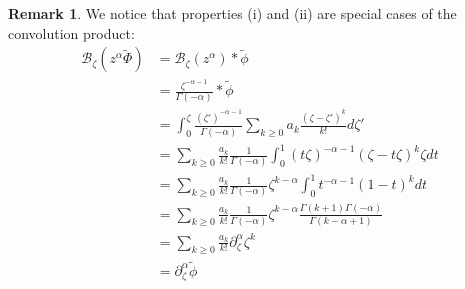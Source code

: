 \documentclass{article}
\theoremstyle{definition}
\newcommand{\borel}{\mathcal{B}}
\newtheorem{remark}[definition]{Remark}
\begin{document}
\begin{remark}
We notice that properties (i) and (ii) are special cases of the convolution product:
\begin{align*}
\borel_\zeta (z^\alpha \tilde{\Phi})&=\borel_\zeta (z^\alpha)\ast \tilde{\phi}\\
&=\frac{\zeta^{-\alpha-1}}{\Gamma(-\alpha)}\ast\tilde{\phi}\\
&=\int_0^\zeta \frac{(\zeta')^{-\alpha-1}}{\Gamma(-\alpha)}\sum_{k\geq 0}a_k\frac{(\zeta-\zeta')^k}{k!}d\zeta'\\
&=\sum_{k\geq 0}\frac{a_k}{k!}\frac{1}{\Gamma(-\alpha)}\int_0^1(t\zeta)^{-\alpha-1}(\zeta-t\zeta)^k\zeta dt\\
&=\sum_{k\geq 0}\frac{a_k}{k!}\frac{1}{\Gamma(-\alpha)}\zeta^{k-\alpha}\int_0^1 t^{-\alpha-1}(1-t)^k dt\\
&=\sum_{k\geq 0}\frac{a_k}{k!}\frac{1}{\Gamma(-\alpha)}\zeta^{k-\alpha}\frac{\Gamma(k+1)\Gamma(-\alpha)}{\Gamma(k-\alpha+1)}\\
&=\sum_{k\geq 0}\frac{a_k}{k!}\partial_\zeta^{\alpha} \zeta^k \\
&=\partial_\zeta^\alpha\tilde{\phi}
\end{align*}
\end{remark}
\end{document}
